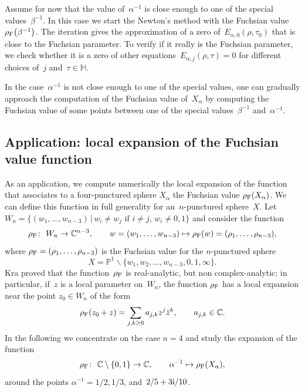 \documentclass[pdftex]{sigma}
\newcommand{\C}{\mathbb{C}}
\newcommand{\pro}{\mathbb{P}}
\newcommand{\Po}{\mathbb{H}}
\numberwithin{equation}{section}
\begin{document}
Assume for now that the value of~$\alpha^{-1}$ is close enough to one of the special values~${\beta}^{-1}$. In this case we start the Newton's method with the Fuchsian value~$\rho_{\rm F}\big({\beta}^{-1}\big)$. The iteration gives the approximation of a zero of~$E_{\alpha,0}(\rho,\tau_0)$ that is close to the Fuchsian parameter. To verify if it really is the Fuchsian parameter, we check whether it is a zero of other equations~$E_{\alpha,j}(\rho,\tau)=0$ for different choices of~$j$ and~$\tau\in\Po$.

In the case~$\alpha^{-1}$ is not close enough to one of the special values, one can gradually approach the computation of the Fuchsian value of~$X_\alpha$ by computing the Fuchsian value of some points between one of the special values~$\beta^{-1}$ and~$\alpha^{-1}$.

\subsection{Application: local expansion of the Fuchsian value function}
As an application, we compute numerically the local expansion of the function that associates to a four-punctured sphere $X_\alpha$ the Fuchsian value $\rho_{\rm F}(X_\alpha)$. We can define this function in full generality for an~$n$-punctured sphere~$X$. Let~$W_n=\{(w_1,\dots, w_{n-3})\,|\,w_i\neq w_j\text{ if }i\neq j,\,w_i\neq 0,1\}$ and consider the function
\[
\rho_{\rm F}\colon \ W_{n}\to\C^{n-3},\qquad w=(w_1,\dots,w_{n-3})\mapsto \rho_{\rm F}(w)=(\rho_1,\dots,\rho_{n-3}),
\]
where $\rho_{\rm F}=(\rho_1,\dots, \rho_{n-3})$ is the Fuchsian value for the $n$-punctured sphere
\[
X=\pro^1\smallsetminus\{w_1,w_2,\dots,w_{n-3},0,1,\infty\}.
\]
Kra \cite{Kra} proved that the function~$\rho_{\rm F}$ is real-analytic, but non complex-analytic; in particular, if~$z$ is a local parameter on~$W_n$, the function $\rho_{\rm F}$ has a local expansion near the point $z_0\in W_n$ of the form
\begin{equation}\label{eqn:exp}
\rho_{\rm F}(z_0+z)=\sum_{j,k\ge 0}{a_{j,k}z^j\bar{z}^k},\qquad a_{j,k}\in\C.
\end{equation}
In the following we concentrate on the case $n=4$ and study the expansion of the function
\[
\rho_{\rm F}\colon \ \C\setminus\{0,1\}\to\C,\qquad \alpha^{-1}\mapsto\rho_{\rm F}(X_\alpha),
\]
around the points $\alpha^{-1}=1/2,1/3$, and~$2/5+3{\rm i}/10$.
\end{document}

